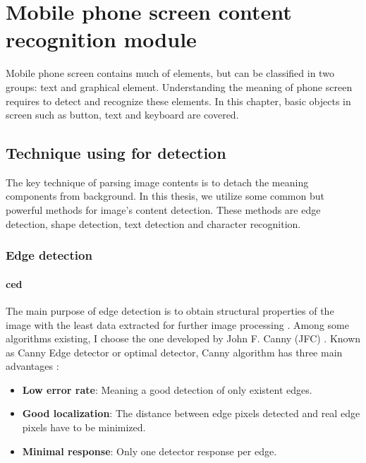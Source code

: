 \chapter{Mobile phone screen content recognition module}
\label{ch:screen_recognize}
Mobile phone screen contains much of elements, but can be classified in two groups: text and graphical element.
Understanding the meaning of phone screen requires to detect and recognize these elements.
In this chapter, basic objects in screen such as button, text and keyboard are covered.

\section{Technique using for detection}
The key technique of parsing image contents is to detach the meaning components from background. In this thesis, we utilize some common but powerful methods for image's content detection. These methods are edge detection, shape detection, text detection and character recognition.

\subsection{Edge detection}
\subsubsection{\acrfull{ced}}
The main purpose of edge detection is to obtain structural properties of the image with the least data extracted for further image processing \cite{canny}. Among some algorithms existing, I choose the one developed by John F. Canny (JFC) \nocite{jfc_canny}. Known as Canny Edge detector or optimal detector, Canny algorithm has three main advantages \cite{code_canny}:
	\begin{itemize}
		\item \textbf{Low error rate}: Meaning a good detection of only existent edges.
		\item \textbf{Good localization}: The distance between edge pixels detected and real edge pixels have to be minimized.
		\item \textbf{Minimal response}: Only one detector response per edge.
	\end{itemize}

